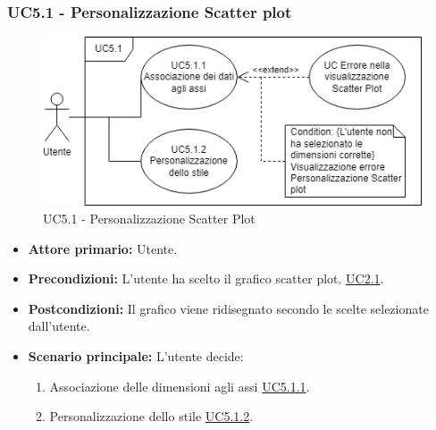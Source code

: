 \subsubsection{UC5.1 - Personalizzazione Scatter plot}
\label{sec:UC5.1}
\begin{figure}[h!]
	\centering
	\includegraphics[scale=0.55]{../../assets/personalizzazioneScatterPlot.drawio.png}
	\caption{UC5.1 - Personalizzazione Scatter Plot}
\end{figure}
\begin{itemize}
    \item \textbf{Attore primario:} Utente.
	\item \textbf{Precondizioni:} L'utente ha scelto il grafico scatter plot. \hyperref[sec:UC2.1]{UC2.1}.
	\item \textbf{Postcondizioni:} 
	Il grafico viene ridisegnato secondo le scelte selezionate dall'utente.
	\item \textbf{Scenario principale:} L'utente decide:
	\begin{enumerate}
        \item Associazione delle dimensioni agli assi \hyperref[sec:UC5.1.1]{UC5.1.1}.
        \item Personalizzazione dello stile \hyperref[sec:UC5.1.2]{UC5.1.2}.
    \end{enumerate}
\end{itemize}
